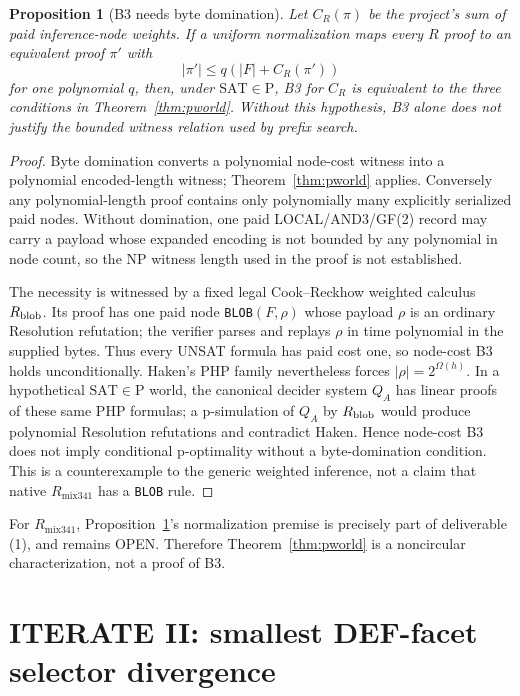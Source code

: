 \documentclass[11pt]{article}
\newtheorem{proposition}{Proposition}
\begin{document}
\begin{proposition}[B3 needs byte domination]\label{prop:bytes}
Let $C_R(\pi)$ be the project's sum of paid inference-node weights.  If a uniform normalization maps every $R$ proof to an equivalent proof $\pi'$ with
\[
|\pi'|\le q(|F|+C_R(\pi'))
\]
for one polynomial $q$, then, under $\mathrm{SAT}\in\mathrm P$, B3 for $C_R$ is equivalent to the three conditions in Theorem~\ref{thm:pworld}.  Without this hypothesis, B3 alone does not justify the bounded witness relation used by prefix search.
\end{proposition}
\begin{proof}
Byte domination converts a polynomial node-cost witness into a polynomial encoded-length witness; Theorem~\ref{thm:pworld} applies.  Conversely any polynomial-length proof contains only polynomially many explicitly serialized paid nodes.  Without domination, one paid LOCAL/AND3/GF(2) record may carry a payload whose expanded encoding is not bounded by any polynomial in node count, so the NP witness length used in the proof is not established.

The necessity is witnessed by a fixed legal Cook--Reckhow weighted calculus $R_{\rm blob}$.  Its proof has one paid node \texttt{BLOB}$(F,\rho)$ whose payload $\rho$ is an ordinary Resolution refutation; the verifier parses and replays $\rho$ in time polynomial in the supplied bytes.  Thus every UNSAT formula has paid cost one, so node-cost B3 holds unconditionally.  Haken's PHP family nevertheless forces $|\rho|=2^{\Omega(h)}$.  In a hypothetical $\mathrm{SAT}\in\mathrm P$ world, the canonical decider system $Q_A$ has linear proofs of these same PHP formulas; a p-simulation of $Q_A$ by $R_{\rm blob}$ would produce polynomial Resolution refutations and contradict Haken.  Hence node-cost B3 does not imply conditional p-optimality without a byte-domination condition.  This is a counterexample to the generic weighted inference, not a claim that native $R_{\mathrm{mix341}}$ has a \texttt{BLOB} rule.
\end{proof}

For $R_{\mathrm{mix341}}$, Proposition~\ref{prop:bytes}'s normalization premise is precisely part of deliverable (1), and remains OPEN.  Therefore Theorem~\ref{thm:pworld} is a noncircular characterization, not a proof of B3.

\section{ITERATE II: smallest DEF-facet selector divergence}
\end{document}
